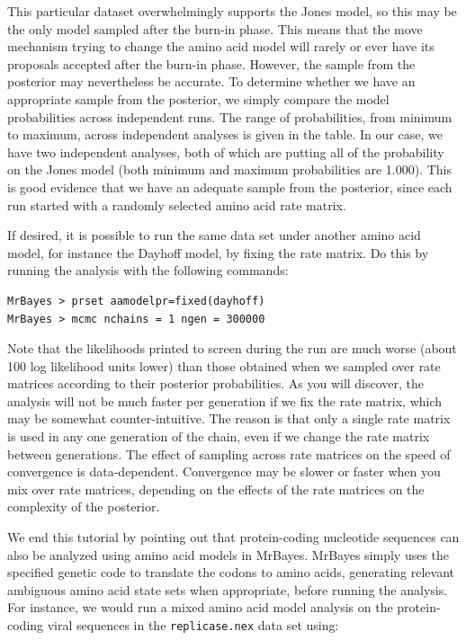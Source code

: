 \documentclass[12pt]{book}
\newcommand{\ttt}[1]{\texttt{#1} }
\begin{document}
This particular dataset overwhelmingly supports the Jones model, so this may be the only model sampled
after the burn-in phase. This means that the move mechanism trying to change the amino acid model will
rarely or ever have its proposals accepted after the burn-in phase. However, the sample from the
posterior may nevertheless be accurate. To determine whether we have an appropriate sample
from the posterior, we simply compare the model probabilities across independent runs. The range of
probabilities, from minimum to maximum, across independent analyses is given in the table. In our case,
we have two independent analyses, both of which are putting all of the probability on the Jones model
(both minimum and maximum probabilities are 1.000). This is good evidence that we have an adequate 
sample from the posterior, since each run started with a randomly selected amino acid rate matrix.

If desired, it is possible to run the same data set under another amino acid model, for instance the Dayhoff
model, by fixing the rate matrix. Do this by running the analysis with the following commands:

\begin{singlespacing}
\begin{verbatim}
MrBayes > prset aamodelpr=fixed(dayhoff)
MrBayes > mcmc nchains = 1 ngen = 300000
\end{verbatim}
\end{singlespacing}

Note that the likelihoods printed to screen during the run are much worse (about 100 log likelihood units lower)
than those obtained when we sampled over rate matrices according to their posterior probabilities.
As you will discover, the analysis will not be much faster per generation if we fix the rate matrix, which may be
somewhat counter-intuitive. The reason is that only a single rate matrix is used in any one generation of the
chain, even if we change the rate matrix between generations. The effect of sampling across
rate matrices on the speed of convergence is data-dependent. Convergence may be slower or faster when
you mix over rate matrices, depending on the effects of the rate matrices on the complexity of the posterior.

We end this tutorial by pointing out that protein-coding nucleotide sequences can also be analyzed using
amino acid models in MrBayes. MrBayes simply uses the specified genetic code to translate the codons to amino acids,
generating relevant ambiguous amino acid state sets when appropriate, before running the analysis. For instance,
we would run a mixed amino acid model analysis on the protein-coding viral sequences in the \ttt{replicase.nex}
data set using:
\end{document}
